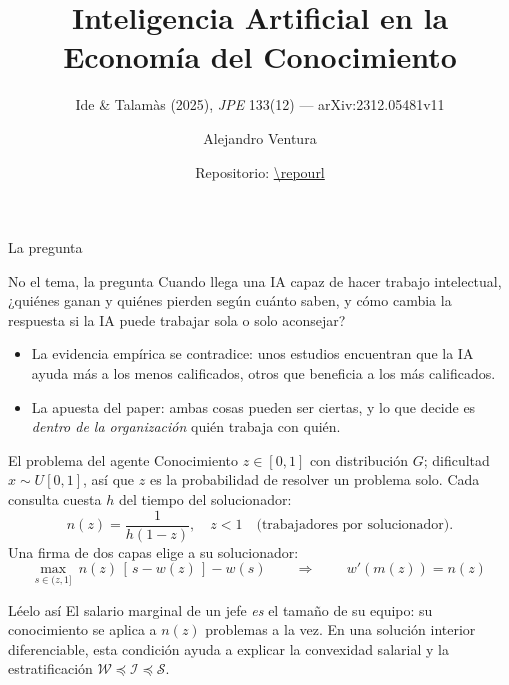 \documentclass[11pt,aspectratio=169]{beamer}
\title{Inteligencia Artificial en la Economía del Conocimiento}
\subtitle{Ide \& Talamàs (2025), \textit{JPE} 133(12) --- arXiv:2312.05481v11}
\author{Alejandro Ventura}
\institute{Universidad del Pacífico --- \textit{AI and Economic Modeling}}
\date{\small Repositorio: \url{\repourl}}
\newcommand{\W}{\mathcal W}
\newcommand{\Sset}{\mathcal S}
\begin{document}
\begin{frame}[plain]
  \titlepage
\end{frame}

\begin{frame}{La pregunta}
  \begin{block}{No el tema, la pregunta}
    Cuando llega una IA capaz de hacer trabajo intelectual, ¿quiénes ganan y quiénes pierden según
    cuánto saben, y cómo cambia la respuesta si la IA puede trabajar sola o solo aconsejar?
  \end{block}
  \vfill
  \begin{itemize}
    \item La evidencia empírica se contradice: unos estudios encuentran que la IA ayuda más a los
      menos calificados, otros que beneficia a los más calificados.
    \item La apuesta del paper: ambas cosas pueden ser ciertas, y lo que decide es \emph{dentro de la
      organización} quién trabaja con quién.
  \end{itemize}
\end{frame}

\begin{frame}{El problema del agente}
  Conocimiento $z\in[0,1]$ con distribución $G$; dificultad $x\sim U[0,1]$, así que $z$ es la
  probabilidad de resolver un problema solo. Cada consulta cuesta $h$ del tiempo del solucionador:
  \[
    n(z)=\frac{1}{h(1-z)},\quad z<1\quad\text{(trabajadores por solucionador).}
  \]
  Una firma de dos capas elige a su solucionador:
  \[
    \max_{s\in(z,1]}\ n(z)\,[\,s-w(z)\,]-w(s)
    \qquad\Longrightarrow\qquad
    \boxed{\,w'(m(z))=n(z)\,}
  \]
  \begin{block}{Léelo así}
    El salario marginal de un jefe \emph{es} el tamaño de su equipo: su conocimiento se aplica a
    $n(z)$ problemas a la vez. En una solución interior diferenciable, esta condición ayuda a explicar la convexidad salarial y la estratificación
    $\W\preceq\mathcal I\preceq\Sset$.
  \end{block}
\end{frame}
\end{document}
